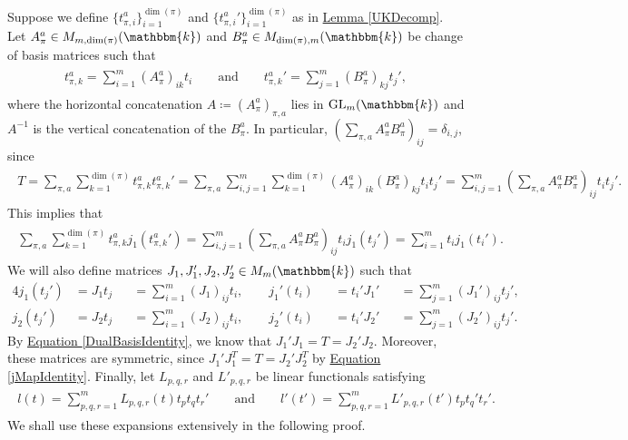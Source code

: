 \noindent Suppose we define $\{t_{\pi,i}^a\}_{i=1}^{\dim(\pi)}$ and $\{{t_{\pi,i}^a}'\}_{i=1}^{\dim(\pi)}$ as in \hyperref[UKDecomp]{Lemma \ref*{UKDecomp}}. Let $A_\pi^a \in M_{m,\dim(\pi)}(\mathbbm{k})$ and $B_\pi^a \in M_{\dim(\pi),m}(\mathbbm{k})$ be change of basis matrices such that
\begin{align*}
\begin{split}
t_{\pi,k}^a = \sum_{i=1}^m (A_\pi^a)_{ik}t_i\qquad\text{and}\qquad {t_{\pi,k}^a}' = \sum_{j=1}^m (B_\pi^a)_{kj}t_j',
\end{split}
\end{align*}
\noindent where the horizontal concatenation $A \coloneqq (A_\pi^a)_{\pi,a}$ lies in $\textup{GL}_m(\mathbbm{k})$ and $A^{-1}$ is the vertical concatenation of the $B_\pi^a$. In particular, $(\sum_{\pi,a} A_\pi^a B_\pi^a)_{ij} = \delta_{i,j}$, since
\begin{align*}
\begin{split}
T = \sum_{\pi,a}\sum_{k=1}^{\dim(\pi)} t_{\pi,k}^a {t_{\pi,k}^a}' = \sum_{\pi,a}\sum_{i,j=1}^m\sum_{k=1}^{\dim(\pi)} (A_\pi^a)_{ik}(B_\pi^a)_{kj} t_i t_j' = \sum_{i,j=1}^m (\sum_{\pi,a} A_\pi^a B_\pi^a)_{ij} t_i t_j'.
\end{split}
\end{align*}
\noindent This implies that
\begin{align*}
\begin{split}
\sum_{\pi,a}\sum_{k=1}^{\dim(\pi)} t_{\pi,k}^a j_1({t_{\pi,k}^a}') = \sum_{i,j=1}^m (\sum_{\pi,a} A_\pi^a B_\pi^a)_{ij}t_i j_1(t_j') = \sum_{i=1}^m t_i j_1(t_i').
\end{split}
\end{align*}
\noindent We will also define matrices $J_1, J_1', J_2, J_2' \in M_m(\mathbbm{k})$ such that
\begin{alignat*}{4}
j_1(t_j') &= J_1t_j &&= \sum_{i=1}^m (J_1)_{ij} t_i,\qquad j_1'(t_i) &&= t_i'J_1' &&= \sum_{j=1}^m (J_1')_{ij} t_j',\\
j_2(t_j') &= J_2t_j &&= \sum_{i=1}^m (J_2)_{ij} t_i, \qquad j_2'(t_i) &&= t_i'J_2' &&= \sum_{j=1}^m (J_2')_{ij} t_j'.
\end{alignat*}
\noindent By \hyperref[DualBasisIdentity]{Equation \eqref*{DualBasisIdentity}}, we know that $J_1'J_1 = T = J_2'J_2$. Moreover, these matrices are symmetric, since $J_1'J_1^T = T = J_2'J_2^T$ by \hyperref[jMapIdentity]{Equation \eqref*{jMapIdentity}}. Finally, let $L_{p,q,r}$ and $L'_{p,q,r}$ be linear functionals satisfying
\begin{align*}
\begin{split}
l(t) = \sum_{p,q,r=1}^m L_{p,q,r}(t) t_pt_qt_r'\qquad\text{and}\qquad l'(t') = \sum_{p,q,r=1}^m L'_{p,q,r}(t') t_pt_q't_r'.
\end{split}
\end{align*}
\noindent We shall use these expansions extensively in the following proof.\\

